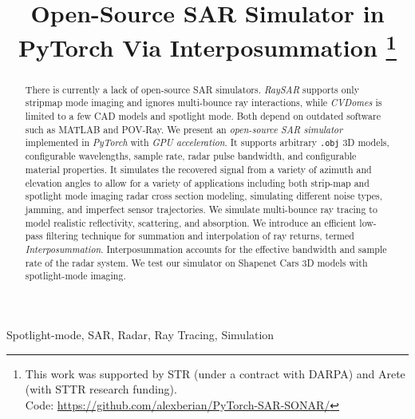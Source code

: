 \documentclass[onecolumn]{IEEEtran}
\begin{document}
\title{Open-Source SAR Simulator in PyTorch Via Interposummation
\thanks{This work was supported by STR (under a contract with DARPA) and Arete (with STTR research funding).\\Code: \href{https://github.com/alexberian/PyTorch-SAR-SONAR/}{https://github.com/alexberian/PyTorch-SAR-SONAR/}}
}

\author{
}

\maketitle

\begin{abstract}
There is currently a lack of open-source SAR simulators. \emph{RaySAR} supports only stripmap mode imaging and ignores multi-bounce ray interactions, while \emph{CVDomes} is limited to a few CAD models and spotlight mode. Both depend on outdated software such as MATLAB and POV-Ray.
We present an \emph{open-source SAR simulator} implemented in \emph{PyTorch} with \emph{GPU acceleration}. It supports arbitrary \texttt{.obj} 3D models, configurable wavelengths, sample rate, radar pulse bandwidth, and configurable material properties. It simulates the recovered signal from a variety of azimuth and elevation angles to allow for a variety of applications including both strip-map and spotlight mode imaging radar cross section modeling, simulating different noise types, jamming, and imperfect sensor trajectories. We simulate multi-bounce ray tracing to model realistic reflectivity, scattering, and absorption.
We introduce an efficient low-pass filtering technique for summation and interpolation of ray returns, termed \emph{Interposummation}. Interposummation accounts for the effective bandwidth and sample rate of the radar system. We test our simulator on Shapenet Cars 3D models with spotlight-mode imaging.\end{abstract}

\begin{IEEEkeywords}
Spotlight-mode, SAR, Radar, Ray Tracing, Simulation
\end{IEEEkeywords}
\end{document}
